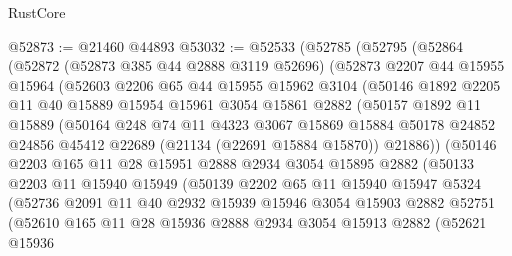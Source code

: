 \begin{lexlean}{RustCore}
\begin{coremodule}
@52873 := @21460 @44893
@53032 := @52533
    (@52785
      (@52795
        (@52864
          (@52872
            (@52873 @385 @44 @2888 @3119 @52696)
            (@52873
              @2207
              @44
              @15955
              @15964
              (@52603
                @2206
                @65
                @44
                @15955
                @15962
                @3104
                (@50146
                  @1892
                  @2205
                  @11
                  @40
                  @15889
                  @15954
                  @15961
                  @3054
                  @15861
                  @2882
                  (@50157
                    @1892
                    @11
                    @15889
                    (@50164
                      @248
                      @74
                      @11
                      @4323
                      @3067
                      @15869
                      @15884
                      @50178
                      @24852
                      @24856
                      @45412
                      @22689
                      (@21134 (@22691 @15884 @15870))
                      @21886))
                  (@50146
                    @2203
                    @165
                    @11
                    @28
                    @15951
                    @2888
                    @2934
                    @3054
                    @15895
                    @2882
                    (@50133
                      @2203
                      @11
                      @15940
                      @15949
                      (@50139
                        @2202
                        @65
                        @11
                        @15940
                        @15947
                        @5324
                        (@52736
                          @2091
                          @11
                          @40
                          @2932
                          @15939
                          @15946
                          @3054
                          @15903
                          @2882
                          @52751
                          (@52610
                            @165
                            @11
                            @28
                            @15936
                            @2888
                            @2934
                            @3054
                            @15913
                            @2882
                            (@52621
                              @15936

\end{coremodule}
\end{lexlean}

